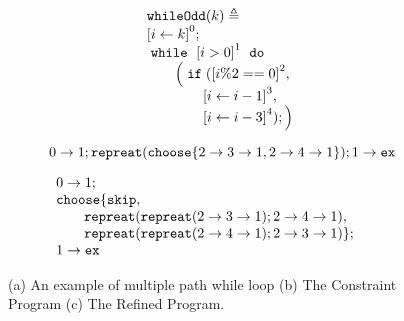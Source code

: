     { \footnotesize
    \begin{figure}
    \centering
    \begin{subfigure}{.3\textwidth}
      \[
        \begin{array}{l}
            \kw{whileOdd}(k) \triangleq \\
            \clabel{ \assign{i}{k} }^{0} ; \\
                \ewhile ~ \clabel{i > 0}^{1} ~ \edo ~ \\
                \qquad \Big(
                  \eif(\clabel{i \% 2 == 0 }^{2}, \\
                  \qquad \qquad \clabel{\assign{i}{i - 1}}^{3},\\
                  \qquad \qquad \clabel{\assign{i}{i - 3}}^{4});
                  \Big)
            \end{array}
        \]
    \end{subfigure}
    \begin{subfigure}{.3\textwidth}
        \begin{centering}
        \begin{tikzpicture}[scale=\textwidth/15cm,samples=200]
    \end{tikzpicture}
    \caption{}
    \end{centering}
    \end{subfigure}
\begin{subfigure}{.5\textwidth}
                \begin{centering}
                    $
    0 \to 1; 
    \rprepeat(\rpchoose\{ 2 \to 3 \to 1, 2 \to 4 \to 1 \}); 
    1 \to \lex
            $
             \caption{}
                \end{centering}
                \end{subfigure}
\begin{subfigure}{.5\textwidth}    
    \begin{centering}
        $
        \begin{array}{l}
            0 \to 1; \\
    \rpchoose\{
        \eskip,\\
        \qquad \rprepeat(\rprepeat(2 \to 3 \to 1); 2 \to 4 \to 1),
        \\
        \qquad \rprepeat(\rprepeat(2 \to 4 \to 1); 2 \to 3 \to 1)
        \}; \\
        1 \to \lex
\end{array}
$
\caption{}
\end{centering}
\end{subfigure}
    \caption{
    (a) An example of multiple path while loop 
    (b) The Constraint Program
    (c) The Refined Program.}
        \label{fig:whileOdd}
    \end{figure}
    }

